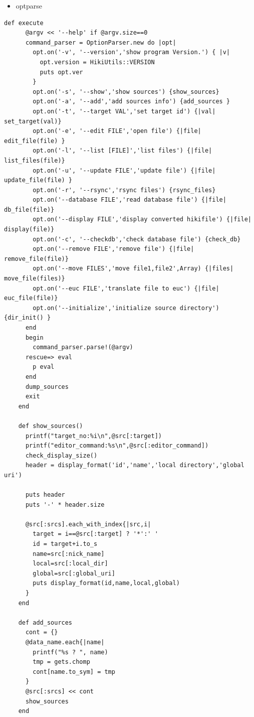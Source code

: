 \begin{itemize}
\item optparse
\end{itemize}\begin{lstlisting}[style=customRuby]
    def execute
      @argv << '--help' if @argv.size==0
      command_parser = OptionParser.new do |opt|
        opt.on('-v', '--version','show program Version.') { |v|
          opt.version = HikiUtils::VERSION
          puts opt.ver
        }
        opt.on('-s', '--show','show sources') {show_sources}
        opt.on('-a', '--add','add sources info') {add_sources }
        opt.on('-t', '--target VAL','set target id') {|val| set_target(val)}
        opt.on('-e', '--edit FILE','open file') {|file| edit_file(file) }
        opt.on('-l', '--list [FILE]','list files') {|file| list_files(file)}
        opt.on('-u', '--update FILE','update file') {|file| update_file(file) }
        opt.on('-r', '--rsync','rsync files') {rsync_files}
        opt.on('--database FILE','read database file') {|file| db_file(file)}
        opt.on('--display FILE','display converted hikifile') {|file| display(file)}
        opt.on('-c', '--checkdb','check database file') {check_db}
        opt.on('--remove FILE','remove file') {|file| remove_file(file)}
        opt.on('--move FILES','move file1,file2',Array) {|files| move_file(files)}
        opt.on('--euc FILE','translate file to euc') {|file| euc_file(file)}
        opt.on('--initialize','initialize source directory') {dir_init() }
      end
      begin
        command_parser.parse!(@argv)
      rescue=> eval
        p eval
      end
      dump_sources
      exit
    end    
    
    def show_sources()
      printf("target_no:%i\n",@src[:target])
      printf("editor_command:%s\n",@src[:editor_command])
      check_display_size()
      header = display_format('id','name','local directory','global uri')

      puts header
      puts '-' * header.size

      @src[:srcs].each_with_index{|src,i|
        target = i==@src[:target] ? '*':' '
        id = target+i.to_s
        name=src[:nick_name]
        local=src[:local_dir]
        global=src[:global_uri]
        puts display_format(id,name,local,global)
      }
    end

    def add_sources
      cont = {}
      @data_name.each{|name|
        printf("%s ? ", name)
        tmp = gets.chomp
        cont[name.to_sym] = tmp
      }
      @src[:srcs] << cont
      show_sources
    end
\end{lstlisting}

